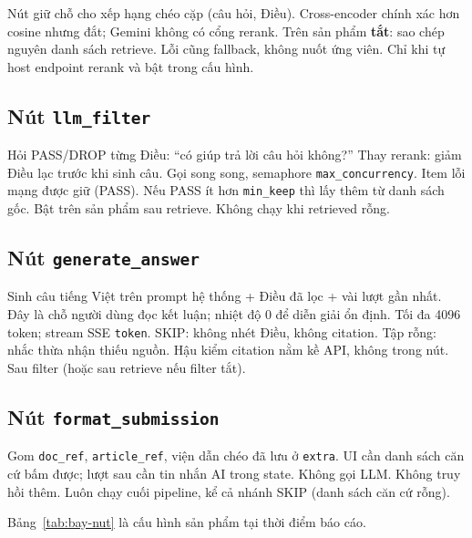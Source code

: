 \boncau
{Nút giữ chỗ cho xếp hạng chéo cặp (câu hỏi, Điều).}
{Cross-encoder chính xác hơn cosine nhưng đắt; Gemini không có cổng rerank.}
{Trên sản phẩm \textbf{tắt}: sao chép nguyên danh sách retrieve. Lỗi cũng
fallback, không nuốt ứng viên.}
{Chỉ khi tự host endpoint rerank và bật trong cấu hình.}

\subsection{Nút \texttt{llm\_filter}}

\boncau
{Hỏi PASS/DROP từng Điều: ``có giúp trả lời câu hỏi không?''}
{Thay rerank: giảm Điều lạc trước khi sinh câu.}
{Gọi song song, semaphore \texttt{max\_concurrency}. Item lỗi mạng được giữ
(PASS). Nếu PASS ít hơn \texttt{min\_keep} thì lấy thêm từ danh sách gốc.}
{Bật trên sản phẩm sau retrieve. Không chạy khi retrieved rỗng.}

\subsection{Nút \texttt{generate\_answer}}

\boncau
{Sinh câu tiếng Việt trên prompt hệ thống + Điều đã lọc + vài lượt gần nhất.}
{Đây là chỗ người dùng đọc kết luận; nhiệt độ 0 để diễn giải ổn định.}
{Tối đa 4096 token; stream SSE \texttt{token}. SKIP: không nhét Điều, không
citation. Tập rỗng: nhắc thừa nhận thiếu nguồn. Hậu kiểm citation nằm kề API,
không trong nút.}
{Sau filter (hoặc sau retrieve nếu filter tắt).}

\subsection{Nút \texttt{format\_submission}}

\boncau
{Gom \texttt{doc\_ref}, \texttt{article\_ref}, viện dẫn chéo đã lưu ở
\texttt{extra}.}
{UI cần danh sách căn cứ bấm được; lượt sau cần tin nhắn AI trong state.}
{Không gọi LLM. Không truy hồi thêm.}
{Luôn chạy cuối pipeline, kể cả nhánh SKIP (danh sách căn cứ rỗng).}

Bảng~\ref{tab:bay-nut} là cấu hình sản phẩm tại thời điểm báo cáo.

